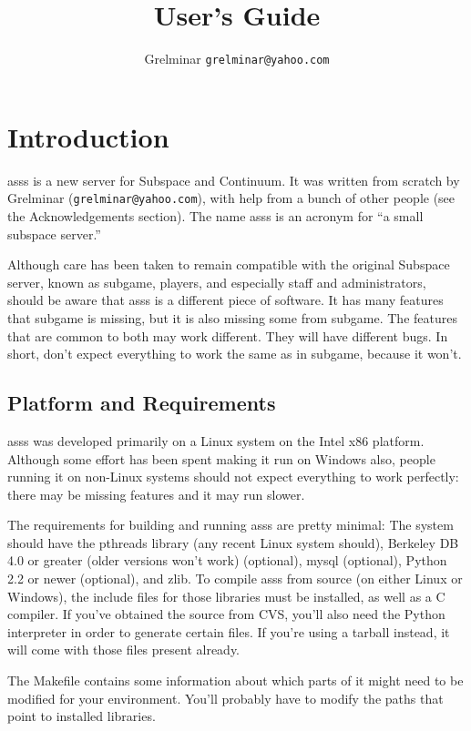 \documentclass{article}
\title{\asss{} User's Guide}
\author{\small Grelminar \lt{}\texttt{grelminar@yahoo.com}\gt{}}
\newcommand{\asss}{asss}
\newcommand{\subgame}{subgame}
\begin{document}
\maketitle

\section{Introduction}

\asss{} is a new server for Subspace and Continuum. It was written from
scratch by Grelminar (\verb/grelminar@yahoo.com/), with help from a
bunch of other people (see the Acknowledgements section). The name
\asss{} is an acronym for ``a small subspace server.''

Although care has been taken to remain compatible with the original
Subspace server, known as \subgame{}, players, and especially staff and
administrators, should be aware that \asss{} is a different piece of
software. It has many features that \subgame{} is missing, but it is
also missing some from \subgame{}. The features that are common to both
may work different. They will have different bugs. In short, don't
expect everything to work the same as in \subgame{}, because it won't.

\subsection{Platform and Requirements}

\asss{} was developed primarily on a Linux system on the Intel x86
platform. Although some effort has been spent making it run on Windows
also, people running it on non-Linux systems should not expect
everything to work perfectly: there may be missing features and it may
run slower.

The requirements for building and running \asss{} are pretty minimal:
The system should have the pthreads library (any recent Linux system
should), Berkeley DB 4.0 or greater (older versions won't work)
(optional), mysql (optional), Python 2.2 or newer (optional), and zlib.
To compile \asss{} from source (on either Linux or Windows), the include
files for those libraries must be installed, as well as a C compiler. If
you've obtained the source from CVS, you'll also need the Python
interpreter in order to generate certain files. If you're using a
tarball instead, it will come with those files present already.

The Makefile contains some information about which parts of it might
need to be modified for your environment. You'll probably have to modify
the paths that point to installed libraries.
\end{document}
